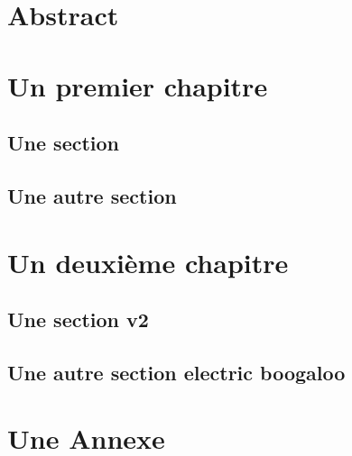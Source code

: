 \documentclass[a4paper, twoside]{report}
\begin{document}
    \lipsum[1]

\clearpage

{ \hypersetup{hidelinks} \tableofcontents {} }

\setcounter{page}{1}
\chapter*{Abstract}
\label{chap:abstract}
\lipsum[1-2]

\chapter{Un premier chapitre}

\lipsum[1]
\section{Une section}
\lipsum
\section{Une autre section}
\lipsum

\chapter{Un deuxième chapitre}

\lipsum[1]
\section{Une section v2}
\lipsum
\section{Une autre section electric boogaloo}
\lipsum






\appendix
\appendixpage
\addappheadtotoc

\chapter{Une Annexe}
\end{document}
